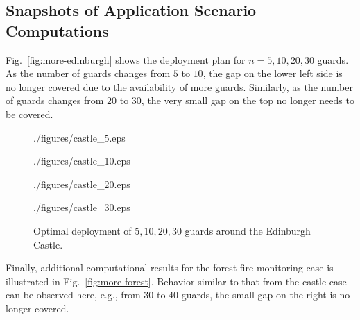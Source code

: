 \subsection{Snapshots of Application Scenario Computations}
Fig.~\ref{fig:more-edinburgh} shows the deployment plan for $n = 5, 10, 20, 
30$ guards. As the number of guards changes from $5$ to $10$, the gap on the
lower left side is no longer covered due to the availability of more guards.
Similarly, as the number of guards changes from $20$ to $30$, the very small 
gap on the top no longer needs to be covered.  

\begin{figure}[ht!]
	\begin{center}
		\begin{overpic}[width={\ifoc 4in \else 2.05in \fi},tics=5]{./figures/castle_5.eps}
		\end{overpic}
    \end{center}
	\begin{center}
		\begin{overpic}[width={\ifoc 4in \else 2.05in \fi},tics=5]{./figures/castle_10.eps}
		\end{overpic}
    \end{center}
	\begin{center}
		\begin{overpic}[width={\ifoc 4in \else 2.05in \fi},tics=5]{./figures/castle_20.eps}
		\end{overpic}
    \end{center}
	\begin{center}
		\begin{overpic}[width={\ifoc 4in \else 2.05in \fi},tics=5]{./figures/castle_30.eps}
		\end{overpic}
	\end{center}
	\vspace*{-2mm}
	\caption{\label{fig:opg-more-edinburgh} Optimal deployment of $5, 10, 20, 30$ 
	guards around the Edinburgh Castle.}
\end{figure}

Finally, additional computational results for the forest fire monitoring
case is illustrated in Fig.~\ref{fig:more-forest}. Behavior similar to that 
from the castle case can be observed here, e.g., from $30$ to $40$ 
guards, the small gap on the right is no longer covered. 


